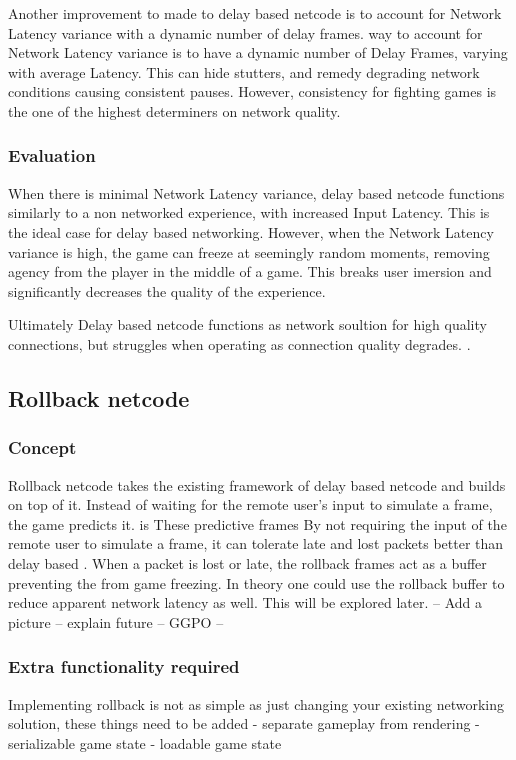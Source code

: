 \documentclass{entcs}
\begin{document}
Another improvement to made to delay based netcode is to account for Network Latency variance with a dynamic number of delay frames. way to account for Network Latency variance is to have a dynamic number of Delay Frames, varying with average Latency\cite{DelayVsRollback}. This can hide stutters, and remedy degrading network conditions causing consistent pauses. However, consistency for fighting games is the one of the highest determiners on network quality\cite{Core-ARollback}.

\subsubsection{Evaluation}
When there is minimal Network Latency variance, delay based netcode functions similarly to a non networked experience, with increased Input Latency. This is the ideal case for delay based networking. However, when the Network Latency variance is high, the game can freeze at seemingly random moments, removing agency from the player in the middle of a game. This breaks user imersion and significantly decreases the quality of the experience\cite{DelayVsRollback}.

Ultimately Delay based netcode functions as network soultion for high quality connections, but struggles when operating as connection quality degrades. \cite{KIInterview}.
\subsection{Rollback netcode}
\subsubsection{Concept}
Rollback netcode takes the existing framework of delay based netcode and builds on top of it. Instead of waiting for the remote user's input to simulate a frame, the game predicts it.  is These predictive frames By not requiring the input of the remote user to simulate a frame, it can tolerate late and lost packets better than delay based \cite{GGPODocumentation}. When a packet is lost or late, the rollback frames act as a buffer preventing the from game freezing. In theory one could use the rollback buffer to reduce apparent network latency as well. This will be explored later.
-- Add a picture -- explain future
-- GGPO --

\subsubsection{Extra functionality required}
Implementing rollback is not as simple as just changing your existing networking solution, these things need to be added
- separate gameplay from rendering
- serializable game state
- loadable game state
\end{document}
